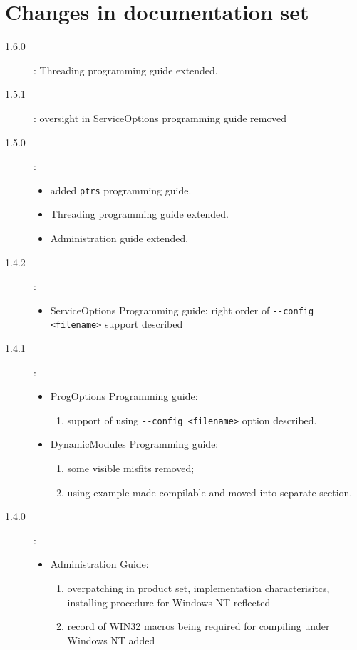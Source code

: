 \documentclass[10pt]{article}
\begin{document}
\section{Changes in documentation set}

\begin{description}

 \item [1.6.0]: Threading programming guide extended. 

 \item [1.5.1]:  oversight in ServiceOptions programming guide removed

 \item [1.5.0]:
       \begin{itemize}
         \item added \verb|ptrs| programming guide.
         \item Threading programming guide extended.
         \item Administration guide extended.
       \end{itemize}

 \item [1.4.2]:
       \begin{itemize}
         \item ServiceOptions Programming guide:
               right order of \verb|--config <filename>| support described
       \end{itemize}

 \item [1.4.1]:
       \begin{itemize}
       \item ProgOptions Programming guide:
             \begin{enumerate}
             \item support of using \verb|--config <filename>| option described.
             \end{enumerate}
       \item DynamicModules Programming guide:
             \begin{enumerate}
             \item some visible misfits removed;
             \item using example made compilable and moved into separate section.
             \end{enumerate}
       \end{itemize}

 \item [1.4.0]:
       \begin{itemize}
       \item Administration Guide:
                     \begin{enumerate}
                     \item overpatching in product set, implementation characterisitcs,
                     installing procedure for Windows NT reflected
                     \item record of WIN32 macros being required for compiling under Windows NT added
                     \end{enumerate}
       \end{itemize}


\end{description}
\end{document}
